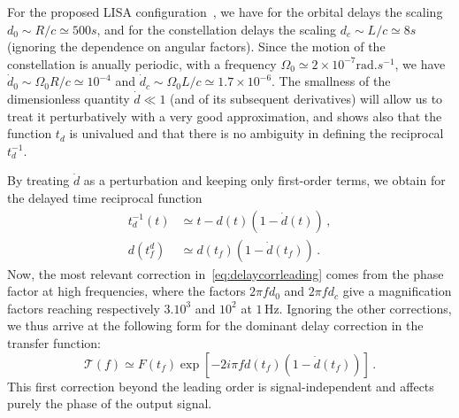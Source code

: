 \documentclass[aps,showpacs,twocolumn,
prd,superscriptaddress,nofootinbib]{revtex4-1}
\newcommand{\be}{\begin{equation}}
\newcommand{\ee}{\end{equation}}
\newcommand\calT{{\mathcal{T}}}
\newcommand{\nn}{\nonumber}
\newcommand{\Hz}{\,\mathrm{Hz}}
\begin{document}
For the proposed LISA configuration~\cite{LISA17}, we have for the orbital delays the scaling $d_{0}\sim R/c \simeq 500s$, and for the constellation delays the scaling $d_{c}\sim L/c \simeq 8s$ (ignoring the dependence on angular factors). Since the motion of the constellation is anually periodic, with a frequency $\Omega_{0} \simeq 2 \times 10^{-7}\mathrm{rad}.s^{-1}$, we have $\dot{d}_{0} \sim \Omega_{0} R/c \simeq 10^{-4}$ and $\dot{d}_{c} \sim \Omega_{0} L/c \simeq 1.7 \times 10^{-6}$. The smallness of the dimensionless quantity $\dot{d} \ll 1$ (and of its subsequent derivatives) will allow us to treat it perturbatively with a very good approximation, and shows also that the function $t_{d}$ is univalued and that there is no ambiguity in defining the reciprocal $t_{d}^{-1}$.

By treating $\dot{d}$ as a perturbation and keeping only first-order terms, we obtain for the delayed time reciprocal function
\begin{align}
	t_{d}^{-1}(t) &\simeq t-d(t) (1-\dot{d}(t)) \,,\nn\\
	d(t_{f}^{d}) &\simeq d(t_{f}) ( 1 - \dot{d}(t_{f})) \,.
\end{align}
Now, the most relevant correction in~\eqref{eq:delaycorrleading} comes from the phase factor at high frequencies, where the factors $2\pi f d_{0}$ and $2\pi f d_{c}$ give a magnification factors reaching respectively $3.10^{3}$ and $10^{2}$ at $1\Hz$. Ignoring the other corrections, we thus arrive at the following form for the dominant delay correction in the transfer function:
\be
	\calT(f) \simeq F(t_{f})\exp\left[ -2i\pi f d(t_{f}) (1-\dot{d}(t_{f})) \right] \,.
\ee
This first correction beyond the leading order is signal-independent and affects purely the phase of the output signal.
\end{document}
